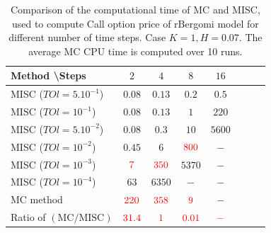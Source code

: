 \documentclass[11pt]{article}
\begin{document}
\begin{table}[h!]
	\centering
	\begin{tabular}{l*{6}{c}r}
		Method \textbackslash  Steps            & $2$ & $4$ & $8$ & $16$ &   \\
		\hline
			MISC ($TOl=5.10^{-1}$)  & $0.08$ & $0.13$ & $0.2$ & $0.5$  \\
		MISC ($TOl=10^{-1}$)  & $0.08$ & $0.13$ & $1$ & $220$  \\
		MISC ($TOl=5.10^{-2}$)  & $0.08$ & $0.3$ & $10$ & $5600$  \\
		MISC ($TOl=10^{-2}$)  & $0.45$ & $6$ & ${\color{red}800}$ & $-$  \\
		MISC ($TOl=10^{-3}$)  & ${\color{red}7}$ & ${\color{red}350}$ & $5370$ & $-$  \\		
			MISC ($TOl=10^{-4}$)  & $63$ & $6350$ & $-$ & $-$  \\	
\hline
		MC method & ${\color{red}220}$  & ${\color{red}358}$  & ${\color{red}9}$ & $-$  \\
		\hline	
		Ratio of $\left(\text{MC}/ \text{MISC} \right)$  &${\color{red}31.4}$ & ${\color{red}  1
		}$  & ${\color{red} 0.01	}$  & ${\color{red}-}$ \\
		\hline
	\end{tabular}
	\caption{Comparison of the computational time of  MC and MISC, used to compute Call option price of rBergomi model for different number of time steps. Case $K=1, H=0.07$. The
average MC CPU time is computed over 10 runs.}
	\label{Comparsion of the computational time of  MC and MISC, used to compute Call option price of rBergomi model for different number of time steps. Case $K=1, H=0.07$}
\end{table}




%	
\end{document}
